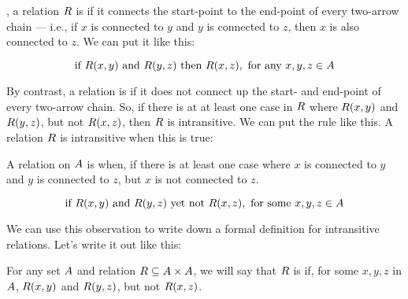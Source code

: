 \documentclass[../../../main.tex]{subfiles}
\begin{document}
, a relation $R$ is  if it connects the start-point to the end-point of every two-arrow chain --- i.e., if $x$ is connected to $y$ and $y$ is connected to $z$, then $x$ is also connected to $z$. We can put it like this:

\begin{equation*}
  \text{ if } R(x, y) \text{ and } R(y, z) \text{ then } R(x, z), \text{ for any $x, y, z \in A$ }
\end{equation*}

By contrast, a relation is  if it does not connect up the start- and end-point of every two-arrow chain. So, if there is at at least one case in $R$ where $R(x, y)$ and $R(y, z)$, but not $R(x, z)$, then $R$ is intransitive. We can put the rule like this. A relation $R$ is intransitive when this is true:

\begin{terminology}
  A relation on $A$ is  when, if there is at least one case where $x$ is connected to $y$ and $y$ is connected to $z$, but $x$ is not connected to $z$.
\end{terminology}

\begin{equation*}
  \text{ if } R(x, y) \text{ and } R(y, z) \text{ yet not } R(x, z), \text{ for some $x, y, z \in A$ }
\end{equation*}

We can use this observation to write down a formal definition for intransitive relations. Let's write it out like this:

\begin{fdefinition}
  \label{def:intransitive-relations}
  For any set $A$ and relation $R \subseteq A \times A$, we will say that $R$ is  if, for some $x, y, z$ in $A$, $R(x, y)$ and $R(y, z)$, but not $R(x, z)$.
\end{fdefinition}
\end{document}

